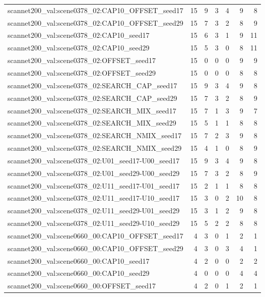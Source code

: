 \begin{table}[t]
\begin{tabular}{lrrrrrr}
scannet200\_val:scene0378\_02:CAP10\_OFFSET\_seed17 & 15 & 9 & 3 & 4 & 9 & 8 \\
scannet200\_val:scene0378\_02:CAP10\_OFFSET\_seed29 & 15 & 7 & 3 & 2 & 8 & 9 \\
scannet200\_val:scene0378\_02:CAP10\_seed17 & 15 & 6 & 3 & 1 & 9 & 11 \\
scannet200\_val:scene0378\_02:CAP10\_seed29 & 15 & 5 & 3 & 0 & 8 & 11 \\
scannet200\_val:scene0378\_02:OFFSET\_seed17 & 15 & 0 & 0 & 0 & 9 & 9 \\
scannet200\_val:scene0378\_02:OFFSET\_seed29 & 15 & 0 & 0 & 0 & 8 & 8 \\
scannet200\_val:scene0378\_02:SEARCH\_CAP\_seed17 & 15 & 9 & 3 & 4 & 9 & 8 \\
scannet200\_val:scene0378\_02:SEARCH\_CAP\_seed29 & 15 & 7 & 3 & 2 & 8 & 9 \\
scannet200\_val:scene0378\_02:SEARCH\_MIX\_seed17 & 15 & 7 & 1 & 3 & 9 & 7 \\
scannet200\_val:scene0378\_02:SEARCH\_MIX\_seed29 & 15 & 5 & 1 & 1 & 8 & 8 \\
scannet200\_val:scene0378\_02:SEARCH\_NMIX\_seed17 & 15 & 7 & 2 & 3 & 9 & 8 \\
scannet200\_val:scene0378\_02:SEARCH\_NMIX\_seed29 & 15 & 4 & 1 & 0 & 8 & 9 \\
scannet200\_val:scene0378\_02:U01\_seed17-U00\_seed17 & 15 & 9 & 3 & 4 & 9 & 8 \\
scannet200\_val:scene0378\_02:U01\_seed29-U00\_seed29 & 15 & 7 & 3 & 2 & 8 & 9 \\
scannet200\_val:scene0378\_02:U11\_seed17-U01\_seed17 & 15 & 2 & 1 & 1 & 8 & 8 \\
scannet200\_val:scene0378\_02:U11\_seed17-U10\_seed17 & 15 & 3 & 0 & 2 & 10 & 8 \\
scannet200\_val:scene0378\_02:U11\_seed29-U01\_seed29 & 15 & 3 & 1 & 2 & 9 & 8 \\
scannet200\_val:scene0378\_02:U11\_seed29-U10\_seed29 & 15 & 5 & 2 & 2 & 8 & 8 \\
scannet200\_val:scene0660\_00:CAP10\_OFFSET\_seed17 & 4 & 3 & 0 & 1 & 2 & 1 \\
scannet200\_val:scene0660\_00:CAP10\_OFFSET\_seed29 & 4 & 3 & 0 & 3 & 4 & 1 \\
scannet200\_val:scene0660\_00:CAP10\_seed17 & 4 & 2 & 0 & 0 & 2 & 2 \\
scannet200\_val:scene0660\_00:CAP10\_seed29 & 4 & 0 & 0 & 0 & 4 & 4 \\
scannet200\_val:scene0660\_00:OFFSET\_seed17 & 4 & 2 & 0 & 1 & 2 & 1 \\

\end{tabular}
\end{table}
